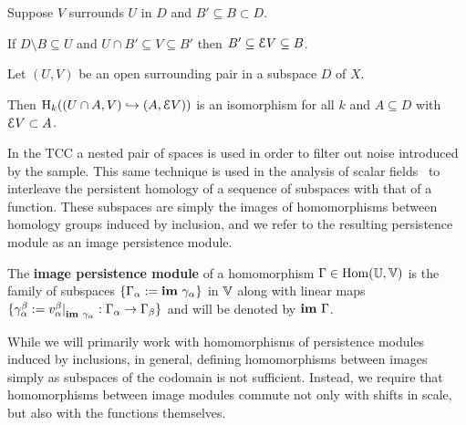 \begin{lemma}\label{lem:surround_and_cover}
  Suppose $V$ surrounds $U$ in $D$ and $B'\subseteq B\subset D$.

  If $D\setminus B\subseteq U$ and $U\cap B'\subseteq V\subseteq B'$ then $B'\subseteq \mathcal{E} V\subseteq B$.
\end{lemma}

\begin{lemma}\label{lem:excision}
  Let $(U, V)$ be an open surrounding pair in a subspace $D$ of $X$.

  Then $\mathrm{H}_k((U\cap A, V)\hookrightarrow (A, \mathcal{E} V))$ is an isomorphism for all $k$ and $A\subseteq D$ with $\mathcal{E} V\subset A$.
\end{lemma}

In the TCC a nested pair of spaces is used in order to filter out noise introduced by the sample.
This same technique is used in the analysis of scalar fields~\cite{chazal09analysis} to interleave the persistent homology of a sequence of subspaces with that of a function.
These subspaces are simply the images of homomorphisms between homology groups induced by inclusion, and we refer to the resulting persistence module as an image persistence module.

\begin{definition}
  The \textbf{image persistence module} of a homomorphism $\Gamma\in\mathrm{Hom}(\mathbb{U},\mathbb{V})$ is the family of subspaces $\{\Gamma_\alpha :=\mathbf{im}~\gamma_\alpha\}$ in $\mathbb{V}$ along with linear maps $\{\gamma_\alpha^\beta := v_\alpha^\beta\mathord{\mid}_{\mathbf{im}~\gamma_\alpha} : \Gamma_\alpha\to\Gamma_\beta\}$ and will be denoted by $\mathbf{im}~\Gamma$.
\end{definition}

While we will primarily work with homomorphisms of persistence modules induced by inclusions, in general, defining homomorphisms between images simply as subspaces of the codomain is not sufficient.
Instead, we require that homomorphisms between image modules commute not only with shifts in scale, but also with the functions themselves.

